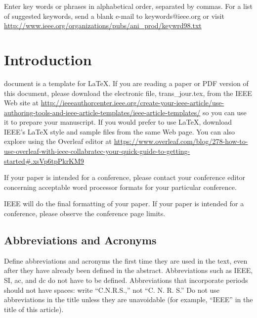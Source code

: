 \documentclass{ieeeaccess}
\begin{document}
\begin{keywords}
Enter key words or phrases in alphabetical
order, separated by commas. For a list of suggested keywords, send a blank
e-mail to keywords@ieee.org or visit \underline
{http://www.ieee.org/organizations/pubs/ani\_prod/keywrd98.txt}
\end{keywords}

\titlepgskip=-15pt

\maketitle

\section{Introduction}
\label{sec:introduction}
 document is a template for \LaTeX. If you are
reading a paper or PDF version of this document, please download the
electronic file, trans\_jour.tex, from the IEEE Web site at \underline
{http://ieeeauthorcenter.ieee.org/create-your-ieee-article/}\break\underline{use-authoring-tools-and-ieee-article-templates/ieee-article-}\break\underline{templates/} so you can use it to prepare your manuscript. If
you would prefer to use LaTeX, download IEEE's LaTeX style and sample files
from the same Web page. You can also explore using the Overleaf editor at
\underline
{https://www.overleaf.com/blog/278-how-to-use-overleaf-}\break\underline{with-ieee-collabratec-your-quick-guide-to-getting-started}\break\underline{\#.xsVp6tpPkrKM9}

If your paper is intended for a conference, please contact your conference
editor concerning acceptable word processor formats for your particular
conference.

IEEE will do the final formatting of your paper. If your paper is intended
for a conference, please observe the conference page limits.

\subsection{Abbreviations and Acronyms}
Define abbreviations and acronyms the first time they are used in the text,
even after they have already been defined in the abstract. Abbreviations
such as IEEE, SI, ac, and dc do not have to be defined. Abbreviations that
incorporate periods should not have spaces: write ``C.N.R.S.,'' not ``C. N.
R. S.'' Do not use abbreviations in the title unless they are unavoidable
(for example, ``IEEE'' in the title of this article).
\end{document}
